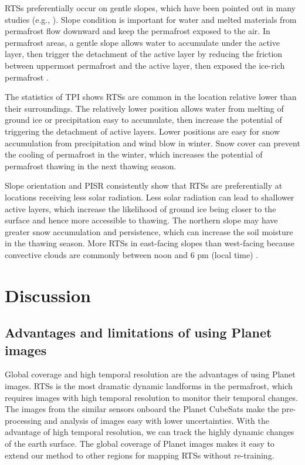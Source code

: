 \documentclass[preprint,12pt,authoryear]{elsarticle}
\begin{document}
RTSs preferentially occur on gentle slopes, which have been pointed out in many studies (e.g., \citealp{leibman1995cryogenic, niu2014thaw, lacelle_distribution_2015}). Slope condition is important for water and melted materials from permafrost flow downward and keep the permafrost exposed to the air. In permafrost areas, a gentle slope allows water to accumulate under the active layer, then trigger the detachment of the active layer by reducing the friction between uppermost permafrost and the active layer, then exposed the ice-rich permafrost \citep{mcroberts1974stability, mcroberts1974the}. 

The statistics of TPI shows RTSs are common in the location relative lower than their surroundings. The relatively lower position allows water from melting of ground ice or precipitation easy to accumulate, then increase the potential of triggering the detachment of active layers. Lower positions are easy for snow accumulation from precipitation and wind blow in winter. Snow cover can prevent the cooling of permafrost in the winter, which increases the potential of permafrost thawing in the next thawing season. 

Slope orientation and PISR consistently show that RTSs are preferentially at locations receiving less solar radiation. Less solar radiation can lead to shallower active layers, which increase the likelihood of ground ice being closer to the surface and hence more accessible to thawing. The northern slope may have greater snow accumulation and persistence, which can increase the soil moisture in the thawing season. More RTSs in east-facing slopes than west-facing because convective clouds are commonly between noon and 6 pm (local time)
\citep{niu2014thaw}.


\section{Discussion}
\label{sec_discussion}

\subsection{Advantages and limitations of using Planet images}
\label{subsec_advantage_limitation_planet}

Global coverage and high temporal resolution are the advantages of using Planet images. RTSs is the most dramatic dynamic landforms in the permafrost, which requires images with high temporal resolution to monitor their temporal changes. The images from the similar sensors onboard the Planet CubeSats make the pre-processing and analysis of images easy with lower uncertainties. With the advantage of high temporal resolution, we can track the highly dynamic changes of the earth surface. 
The global coverage of Planet images makes it easy to extend our method to other regions for mapping RTSs without re-training. 
\end{document}
